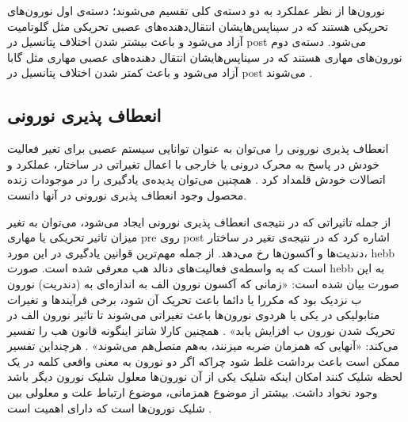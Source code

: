 \documentclass[12pt]{report}
\begin{document}
	نورون‌ها از نظر عملکرد به دو دسته‌ی کلی تقسیم می‌شوند؛ دسته‌ی اول نورون‌های تحریکی هستند که در سیناپس‌هایشان انتقال‌دهنده‌های عصبی تحریکی مثل گلوتامیت آزاد می‌شود و باعث بیشتر شدن اختلاف پتانسیل در \gls{post} می‌شود. دسته‌ی دوم نورون‌های مهاری هستند که در سیناپس‌هایشان انتقال دهنده‌های عصبی مهاری مثل گابا آزاد می‌شود و باعث کمتر شدن اختلاف پتانسیل در \gls{post} می‌شوند
	\cite{Purves2001-ns}.
	
	
	\subsection{انعطاف پذیری نورونی}
	
	انعطاف پذیری نورونی را می‌توان به عنوان توانایی سیستم عصبی برای تغیر فعالیت خودش در پاسخ به محرک درونی یا خارجی با اعمال تغیراتی در ساختار، عملکرد و اتصالات خودش قلمداد کرد
	\cite{MateosAparicio2019}.
	همچنین می‌توان پدیده‌ی یادگیری را در موجودات زنده محصول وجود انعطاف پذیری نورونی در آنها دانست.
	
	از جمله تاثیراتی که در نتیجه‌ی انعطاف پذیری نورونی ایجاد می‌شود، می‌توان به تغیر میزان تاثیر تحریکی یا مهاری \gls{pre} روی \gls{post} اشاره کرد که در نتیجه‌ی تغیر در ساختار دندیت‌ها و آکسون‌ها رخ می‌دهد.
	از جمله مهم‌ترین ‌قوانین یادگیری در این مورد، \gls{hebb}‌ است که به واسطه‌ی فعالیت‌های دنالد هب معرفی شده است.
	صورت \gls{hebb} به این صورت بیان شده است: «زمانی که آکسون نورون الف به اندازه‌ای به (دندریت) نورون ب نزدیک  بود که مکررا یا دائما باعث تحریک آن شود، برخی فر‌آیند‌ها و تغیرات متابولیکی در یکی یا هر‌دوی نورو‌ن‌ها باعث تغیراتی می‌شوند تا تاثیر نورون الف در تحریک شدن نورون ب افزایش یابد»
	\cite{hebb1949organization}.
	همچنین کارلا شاتز اینگونه قانون هب را تفسیر می‌کند: «آنهایی که همزمان ضربه میزنند، به‌هم متصل‌هم می‌شوند»
	\cite{shatz1992developing}.
	هرچند‌این تفسیر ممکن است باعث برداشت غلط شود چراکه اگر دو نورون به معنی واقعی کلمه در یک لحظه شلیک کنند امکان اینکه شلیک یکی از آن نورون‌ها معلول شلیک نورون دیگر باشد وجود نخواد داشت. بیشتر از موضوع همزمانی، موضوع ارتباط علت و معلولی بین شلیک نورون‌ها است که دارای اهمیت است
	\cite{granger1969investigating}.
	
\end{document}
